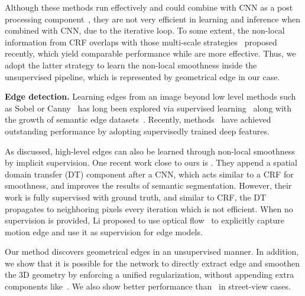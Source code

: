 Although these methods run effectively and could combine with CNN as a post processing component~\cite{arnab2016higher,crfasrnn_iccv2015,peng2016depth,wang2017occlusion}, they are not very efficient in learning and inference when combined with CNN, due to the iterative loop. To some extent, the non-local information from CRF overlaps with those multi-scale strategies~\cite{zhao2016pyramid,ChenPSA17} proposed recently, which yield comparable performance while are more effective. Thus, we adopt the latter strategy to learn the non-local smoothness inside the unsupervised pipeline, which is represented by geometrical edge in our case.


\textbf{Edge detection.}
Learning edges from an image beyond low level methods such as Sobel or Canny~\cite{canny1986computational} has long been explored via supervised learning~\cite{yamaguchi2012continuous,konishi2003statistical,arbelaez2011contour,DollarICCV13edges} along with the growth of semantic edge datasets~\cite{MartinFTM01,hou2013boundary}. Recently, methods~\cite{bertasius2015high,xie2015holistically,DBLP:journals/corr/Kokkinos15} have achieved outstanding performance by adopting supervisedly trained deep features. 

As discussed, high-level edges can also be learned through non-local smoothness by implicit supervision. One recent work close to ours is \cite{chen2016semantic}. They append a spatial domain transfer (DT) component after a CNN, which acts similar to a CRF for smoothness, and improves the results of semantic segmentation. However, their work is fully supervised with ground truth, and similar to CRF, the DT propagates to neighboring pixels every iteration which is not efficient. When no supervision is provided, Li \etal \cite{li2016unsupervised} proposed to use optical flow~\cite{revaud2015epicflow} to explicitly capture motion edge and use it as supervision for edge models. 

Our method discovers geometrical edges in an unsupervised manner. In addition, we show that it is possible for the network to directly extract edge and smoothen the 3D geometry by enforcing a unified regularization, without appending extra components like~\cite{chen2016semantic}. We also show better performance than~\cite{li2016unsupervised} in street-view cases. 

